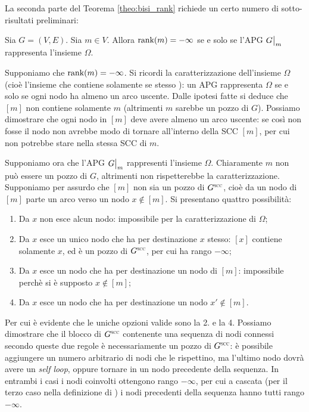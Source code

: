 La seconda parte del Teorema \ref{theo:bisi_rank} richiede un certo numero di sotto-risultati preliminari:
\begin{proposition}
    \label{prop:omega_rank}
    Sia $G = (V,E)$. Sia $m \in V$. Allora $\textup{rank}(m) = -\infty$ se e solo se l'APG $\restr{G}{m}$ rappresenta l'insieme $\Omega$.
\end{proposition}
\begin{proof2}
    Supponiamo che $\textup{rank}(m) = - \infty$. Si ricordi la caratterizzazione dell'insieme $\Omega$ (cioè l'insieme che contiene solamente se stesso \cite{aczel}): un APG rappresenta $\Omega$ se e solo se ogni nodo ha almeno un arco uscente. Dalle ipotesi fatte si deduce che $[m]$ non contiene solamente $m$ (altrimenti $m$ sarebbe un pozzo di $G$). Possiamo dimostrare che ogni nodo in $[m]$ deve avere almeno un arco uscente: se così non fosse il nodo non avrebbe modo di tornare all'interno della SCC $[m]$, per cui non potrebbe stare nella stessa SCC di $m$.

    Supponiamo ora che l'APG $\restr{G}{m}$ rappresenti l'insieme $\Omega$. Chiaramente $m$ non può essere un pozzo di $G$, altrimenti non rispetterebbe la caratterizzazione. Supponiamo per assurdo che $[m]$ non sia un pozzo di $G^{\superscc}$, cioè da un nodo di $[m]$ parte un arco verso un nodo $x \not\in [m]$. Si presentano quattro possibilità:
    \begin{enumerate}
        \item Da $x$ non esce alcun nodo: impossibile per la caratterizzazione di $\Omega$;
        \item Da $x$ esce un unico nodo che ha per destinazione $x$ stesso: $[x]$ contiene solamente $x$, ed è un pozzo di $G^{\superscc}$, per cui ha rango $-\infty$;
        \item Da $x$ esce un nodo che ha per destinazione un nodo di $[m]$: impossibile perchè si è supposto $x \not\in [m]$;
        \item Da $x$ esce un nodo che ha per destinazione un nodo $x' \not\in [m]$.
    \end{enumerate}
    Per cui è evidente che le uniche opzioni valide sono la 2. \hspace{-0.4cm} e la 4. Possiamo dimostrare che il blocco di $G^{\superscc}$ contenente una sequenza di nodi connessi secondo queste due regole è necessariamente un pozzo di $G^{\superscc}$: è possibile aggiungere un numero arbitrario di nodi che le rispettino, ma l'ultimo nodo dovrà avere un \emph{self loop}, oppure tornare in un nodo precedente della sequenza. In entrambi i casi i nodi coinvolti ottengono rango $-\infty$, per cui a cascata (per il terzo caso nella definizione di \rankfunc) i nodi precedenti della sequenza hanno tutti rango $-\infty$.
\end{proof2}


